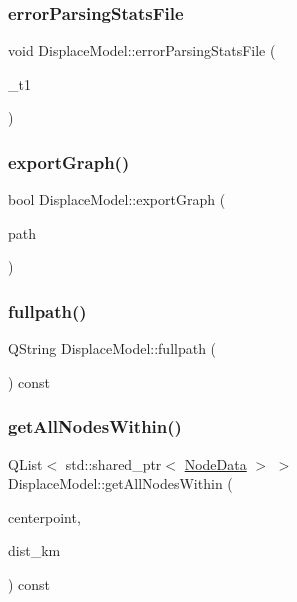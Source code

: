 \subsubsection{\texorpdfstring{errorParsingStatsFile}{errorParsingStatsFile}}
{\footnotesize\ttfamily void Displace\+Model\+::error\+Parsing\+Stats\+File (\begin{DoxyParamCaption}\item[{Q\+String}]{\+\_\+t1 }\end{DoxyParamCaption})\hspace{0.3cm}{\ttfamily [signal]}}

\mbox{\label{class_displace_model_ab855bb4cd38f92dcd1a89a42c2c7c1af}} 
\subsubsection{\texorpdfstring{exportGraph()}{exportGraph()}}
{\footnotesize\ttfamily bool Displace\+Model\+::export\+Graph (\begin{DoxyParamCaption}\item[{const Q\+String \&}]{path }\end{DoxyParamCaption})}

\mbox{\label{class_displace_model_a137b0bd76c221bc6281555ba3d7af446}} 
\subsubsection{\texorpdfstring{fullpath()}{fullpath()}}
{\footnotesize\ttfamily Q\+String Displace\+Model\+::fullpath (\begin{DoxyParamCaption}{ }\end{DoxyParamCaption}) const\hspace{0.3cm}{\ttfamily [inline]}}

\mbox{\label{class_displace_model_aef5796a9a7cafe8dea2fc6fb634d2dbe}} 
\subsubsection{\texorpdfstring{getAllNodesWithin()}{getAllNodesWithin()}}
{\footnotesize\ttfamily Q\+List$<$ std\+::shared\+\_\+ptr$<$ \mbox{\hyperlink{class_node_data}{Node\+Data}} $>$ $>$ Displace\+Model\+::get\+All\+Nodes\+Within (\begin{DoxyParamCaption}\item[{const Q\+PointF \&}]{centerpoint,  }\item[{double}]{dist\+\_\+km }\end{DoxyParamCaption}) const}

